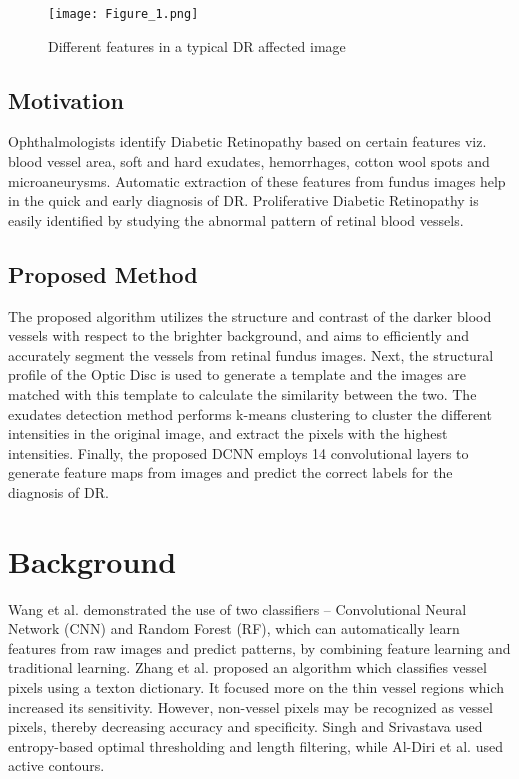 \documentclass{svproc}
\begin{document}
\begin{figure}
    \centering
    \texttt{[image: Figure\_1.png]}
    \caption{Different features in a typical DR affected image}
    \label{fig: fig1}
\end{figure}


\subsection{Motivation}

Ophthalmologists identify Diabetic Retinopathy based on certain features viz. blood vessel area, soft and hard exudates, hemorrhages, cotton wool spots and microaneurysms. Automatic extraction of these features from fundus images help in the quick and early diagnosis of DR. Proliferative Diabetic Retinopathy is easily identified by studying the abnormal pattern of retinal blood vessels.


\subsection{Proposed Method}

The proposed algorithm utilizes the structure and contrast of the darker blood vessels with respect to the brighter background, and aims to efficiently and accurately segment the vessels from retinal fundus images.
Next, the structural profile of the Optic Disc is used to generate a template and the images are matched with this template to calculate the similarity between the two.
The exudates detection method performs k-means clustering to cluster the different intensities in the original image, and extract the pixels with the highest intensities. 
Finally, the proposed DCNN employs 14 convolutional layers to generate feature maps from images and predict the correct labels for the diagnosis of DR.


\section{Background}

Wang et al.\cite{wang} demonstrated the use of two classifiers – Convolutional Neural Network (CNN) and Random Forest (RF), which can automatically learn features from raw images and predict patterns, by combining feature learning and traditional learning. Zhang et al. \cite{zhang} proposed an algorithm which classifies vessel pixels using a texton dictionary. It focused more on the thin vessel regions which increased its sensitivity. However, non-vessel pixels may be recognized as vessel pixels, thereby decreasing accuracy and specificity. Singh and Srivastava \cite{singh} used entropy-based optimal thresholding and length filtering, while Al-Diri et al. \cite{aldiri} used active contours.
\end{document}
